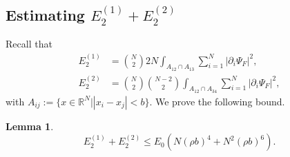 \documentclass[a4paper,11pt]{article}
\newcommand{\abs}[1]{\left\lvert #1 \right\rvert}
\newcommand{\R}{\mathbb{R}}
\newtheorem{lemma}[theorem]{Lemma}
\numberwithin{equation}{section}
\begin{document}
	\subsection{Estimating $E_2^{(1)}+E_2^{(2)}$}
	\label{secE2}
	Recall that \begin{equation}
		\begin{aligned}
			E_2^{(1)}&=\binom{N}{2}2N\int_{A_{12}\cap A_{13}}\sum_{i=1}^{N}\abs{\partial_i\Psi_F}^2,\\ E_2^{(2)}&=\binom{N}{2}\binom{N-2}{2}\int_{A_{12}\cap A_{34}}\sum_{i=1}^{N}\abs{\partial_i\Psi_F}^2,
		\end{aligned}
	\end{equation}
	with $A_{ij}:=\{x\in\R^N\vert \abs{x_i-x_j}<b\}$. We prove the following bound. 
	\begin{lemma}\label{LemmaE2Bound}
		\begin{equation}
			E_2^{(1)}+E_2^{(2)}\leq E_0\left(N(\rho b)^4+N^2(\rho b)^6\right).
		\end{equation}
	\end{lemma}
\end{document}
